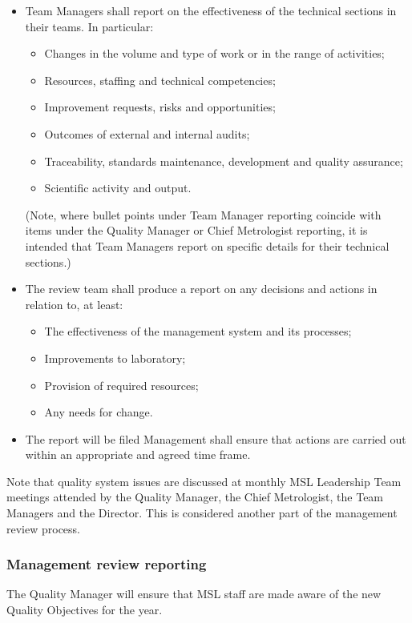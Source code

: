 \begin{itemize}
\item Team Managers shall report on the effectiveness of the technical sections in their teams. In particular: 
\begin{itemize}
\item Changes in the volume and type of work or in the range of activities;
\item Resources, staffing and technical competencies;
\item Improvement requests, risks and opportunities;
\item Outcomes of external and internal audits;
\item Traceability, standards maintenance, development and quality assurance;
\item Scientific activity and output.
\end{itemize}
(Note, where bullet points under Team Manager reporting coincide with items under the Quality Manager or Chief Metrologist reporting, it is intended that Team Managers report on specific details for their technical sections.) 
\item The review team shall produce a report on any decisions and actions in relation to, at least:
\begin{itemize}
\item The effectiveness of the management system and its processes;
\item Improvements to laboratory;
\item Provision of required resources;
\item Any needs for change.
\end{itemize}
\item The report will be filed  Management shall ensure that actions are carried out within an appropriate and agreed time frame.
\end{itemize}

Note that quality system issues are discussed at monthly MSL Leadership Team meetings attended by the Quality Manager, the Chief Metrologist, the Team Managers and the Director. This is considered another part of the management review process.
\subsubsection{Management review reporting}
The Quality Manager will ensure that MSL staff are made aware of the new Quality Objectives for the year.